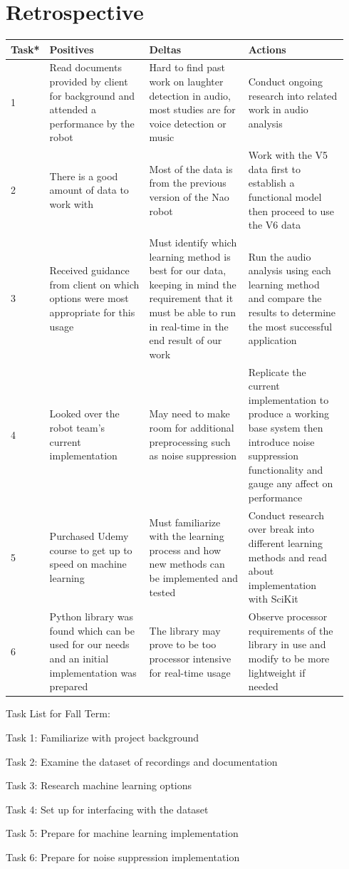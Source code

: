 \documentclass[onecolumn, draftclsnofoot,10pt, compsoc]{IEEEtran}
\begin{document}
\section{Retrospective}
\vspace{.4cm}
\begin{tabular}{|p{0.04\linewidth}|p{0.3\linewidth}|p{0.3\linewidth}|p{0.3\linewidth}|}
\hline
\centering Task* &
\centering Positives &
\centering Deltas &   
\centering Actions
\tabularnewline
\hline
1  & 
Read documents provided by client for background and attended a performance by the robot  & 
Hard to find past work on laughter detection in audio, most studies are for voice detection or music  & 
Conduct ongoing research into related work in audio analysis 
\tabularnewline
\hline
2  & 
There is a good amount of data to work with  & 
Most of the data is from the previous version of the Nao robot  & 
Work with the V5 data first to establish a functional model then proceed to use the V6 data 
\tabularnewline
\hline
3  & 
Received guidance from client on which options were most appropriate for this usage  & 
Must identify which learning method is best for our data, keeping in mind the requirement that it must be able to run in real-time in the end result of our work  & 
Run the audio analysis using each learning method and compare the results to determine the most successful application
\tabularnewline
\hline
4  & 
Looked over the robot team's current implementation  & 
May need to make room for additional preprocessing such as noise suppression  & 
Replicate the current implementation to produce a working base system then introduce noise suppression functionality and gauge any affect on performance 
\tabularnewline
\hline
5  & 
Purchased Udemy course to get up to speed on machine learning  & 
Must familiarize with the learning process and how new methods can be implemented and tested  & 
Conduct research over break into different learning methods and read about implementation with SciKit 
\tabularnewline
\hline
6  & 
Python library was found which can be used for our needs and an initial implementation was prepared  & 
The library may prove to be too processor intensive for real-time usage  & 
Observe processor requirements of the library in use and modify to be more lightweight if needed 
\tabularnewline
\hline
\end{tabular}
\vspace{.4cm}
\par
\noindent * Task List for Fall Term:\par
\noindent Task 1: Familiarize with project background\par
\noindent Task 2: Examine the dataset of recordings and documentation\par
\noindent Task 3: Research machine learning options\par
\noindent Task 4: Set up for interfacing with the dataset\par
\noindent Task 5: Prepare for machine learning implementation\par
\noindent Task 6: Prepare for noise suppression implementation
\end{document}
